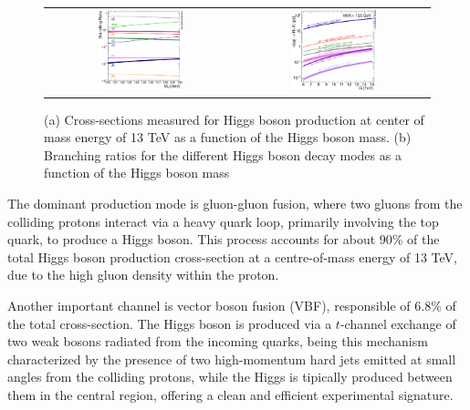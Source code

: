 \begin{figure}[htbp]
        \centering
        \begin{tabular}{cc}
        \includegraphics[width=0.46\textwidth]{images/higgs_dec.pdf} & 
        \includegraphics[width=0.46\textwidth]{images/higgs_prod.pdf}
        \end{tabular}
        \caption{ (a) Cross-sections measured for Higgs boson production at center of mass energy of 13 TeV as a function
        of the Higgs boson mass. (b) Branching ratios for the different Higgs boson decay modes as a function of the Higgs boson mass~\cite{Nature_ATLAS}}
        \label{fig:higgs_comb}
    \end{figure}

The dominant production mode is gluon-gluon fusion, where two gluons from the colliding protons interact via a heavy quark loop, primarily involving the top quark, to produce a Higgs boson. This process accounts for about 90\% of the total Higgs boson production cross-section at a centre-of-mass energy of 13 TeV, due to the high gluon density within the proton.

Another important channel is vector boson fusion (VBF), responsible of $6.8\%$ of the total cross-section. The Higgs boson is produced via a $t$-channel exchange of two weak bosons radiated from the incoming quarks, being this mechanism characterized by the presence of two high-momentum hard jets emitted at small angles from the colliding protons, while the Higgs is tipically produced between them in the central region, offering a clean and efficient experimental signature. 

